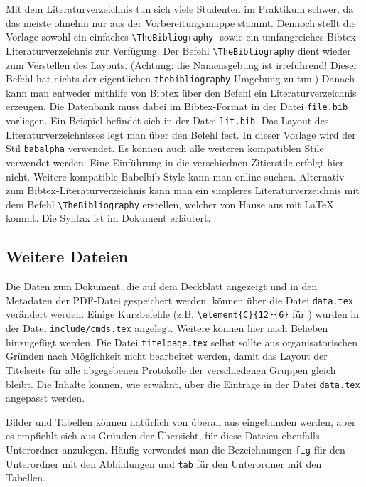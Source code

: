 Mit dem Literaturverzeichnis tun sich viele Studenten im Praktikum schwer, da das meiste ohnehin nur aus der Vorbereitungsmappe stammt. Dennoch stellt die Vorlage sowohl ein einfaches \verb|\TheBibliography|- sowie ein umfangreiches Bibtex-Literaturverzeichnis zur Verfügung. Der Befehl \verb|\TheBibliography| dient wieder zum Verstellen des Layouts. (Achtung: die Namensgebung ist irreführend! Dieser Befehl hat nichts der eigentlichen \verb|thebibliography|-Umgebung zu tun.) Danach kann man entweder mithilfe von Bibtex über den Befehl \verb|| ein Literaturverzeichnis erzeugen. Die Datenbank muss dabei im Bibtex-Format in der Datei \verb|file.bib| vorliegen. Ein Beispiel befindet sich in der Datei \verb|lit.bib|. Das Layout des Literaturverzeichnisses legt man über den Befehl \verb|| fest. In dieser Vorlage wird der Stil \verb|babalpha| verwendet. Es können auch alle weiteren kompatiblen Stile verwendet werden. Eine Einführung in die verschiednen Zitierstile erfolgt  hier nicht. Weitere kompatible Babelbib-Style kann man online suchen. Alternativ zum Bibtex-Literaturverzeichnis kann man ein simpleres Literaturverzeichnis mit dem Befehl \verb|\TheBibliography| erstellen, welcher von Hause aus mit LaTeX kommt. Die Syntax ist im Dokument erläutert.

\subsection{Weitere Dateien}
Die Daten zum Dokument, die auf dem Deckblatt angezeigt und in den Metadaten der PDF-Datei gespeichert werden, können über die Datei \verb|data.tex| verändert werden. Einige Kurzbefehle (z.B. \verb|\element{C}{12}{6}| für ) wurden in der Datei \verb|include/cmds.tex| angelegt. Weitere können hier nach Belieben hinzugefügt werden. Die Datei \verb|titelpage.tex| selbst sollte aus organisatorischen Gründen nach Möglichkeit nicht bearbeitet werden, damit das Layout der Titelseite für alle abgegebenen Protokolle der verschiedenen Gruppen gleich bleibt. Die Inhalte können, wie erwähnt, über die Einträge in der Datei \verb|data.tex| angepasst werden.

Bilder und Tabellen können natürlich von überall aus eingebunden werden, aber es empfiehlt sich aus Gründen der Übersicht, für diese Dateien ebenfalls Unterordner anzulegen. Häufig verwendet man die Bezeichnungen \verb|fig| für den Unterordner mit den Abbildungen und \verb|tab| für den Unterordner mit den Tabellen.



